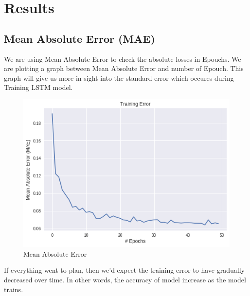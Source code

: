\chapter{Results}

\section{Mean Absolute Error (MAE)}
We are using Mean Absolute Error to check the absolute losses in Epouchs. We are plotting a graph between Mean Absolute Error and number of Epouch. This graph will give us more in-sight into the standard error which occures during Training LSTM model.

\begin{figure}[h]
    \centering \includegraphics[scale=0.5]{images/mae.png}
    \caption{Mean Absolute Error}
\end{figure}

If everything went to plan, then we'd expect the training error to have gradually decreased over time. In other words, the accuracy of model increase as the model trains.


